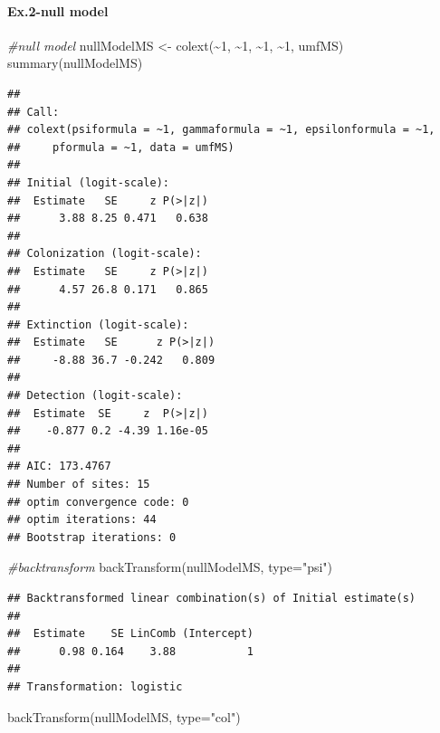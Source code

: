 \documentclass[
]{article}
\newenvironment{Shaded}{\begin{snugshade}}{\end{snugshade}}
\newcommand{\AttributeTok}[1]{\textcolor[rgb]{0.77,0.63,0.00}{#1}}
\newcommand{\CommentTok}[1]{\textcolor[rgb]{0.56,0.35,0.01}{\textit{#1}}}
\newcommand{\DecValTok}[1]{\textcolor[rgb]{0.00,0.00,0.81}{#1}}
\newcommand{\FunctionTok}[1]{\textcolor[rgb]{0.00,0.00,0.00}{#1}}
\newcommand{\NormalTok}[1]{#1}
\newcommand{\OtherTok}[1]{\textcolor[rgb]{0.56,0.35,0.01}{#1}}
\newcommand{\SpecialCharTok}[1]{\textcolor[rgb]{0.00,0.00,0.00}{#1}}
\newcommand{\StringTok}[1]{\textcolor[rgb]{0.31,0.60,0.02}{#1}}
\begin{document}
\hypertarget{ex.2-null-model}{%
\paragraph{\texorpdfstring{\textbf{Ex.2-null model
}}{Ex.2-null model }}\label{ex.2-null-model}}

\begin{Shaded}
\begin{Highlighting}[]
\CommentTok{\#null model}
\NormalTok{nullModelMS }\OtherTok{\textless{}{-}} \FunctionTok{colext}\NormalTok{(}\SpecialCharTok{\textasciitilde{}}\DecValTok{1}\NormalTok{, }\SpecialCharTok{\textasciitilde{}}\DecValTok{1}\NormalTok{, }\SpecialCharTok{\textasciitilde{}}\DecValTok{1}\NormalTok{, }\SpecialCharTok{\textasciitilde{}}\DecValTok{1}\NormalTok{, umfMS)}
\FunctionTok{summary}\NormalTok{(nullModelMS)}
\end{Highlighting}
\end{Shaded}

\begin{verbatim}
## 
## Call:
## colext(psiformula = ~1, gammaformula = ~1, epsilonformula = ~1, 
##     pformula = ~1, data = umfMS)
## 
## Initial (logit-scale):
##  Estimate   SE     z P(>|z|)
##      3.88 8.25 0.471   0.638
## 
## Colonization (logit-scale):
##  Estimate   SE     z P(>|z|)
##      4.57 26.8 0.171   0.865
## 
## Extinction (logit-scale):
##  Estimate   SE      z P(>|z|)
##     -8.88 36.7 -0.242   0.809
## 
## Detection (logit-scale):
##  Estimate  SE     z  P(>|z|)
##    -0.877 0.2 -4.39 1.16e-05
## 
## AIC: 173.4767 
## Number of sites: 15
## optim convergence code: 0
## optim iterations: 44 
## Bootstrap iterations: 0
\end{verbatim}

\begin{Shaded}
\begin{Highlighting}[]
\CommentTok{\#backtransform}
\FunctionTok{backTransform}\NormalTok{(nullModelMS, }\AttributeTok{type=}\StringTok{"psi"}\NormalTok{)}
\end{Highlighting}
\end{Shaded}

\begin{verbatim}
## Backtransformed linear combination(s) of Initial estimate(s)
## 
##  Estimate    SE LinComb (Intercept)
##      0.98 0.164    3.88           1
## 
## Transformation: logistic
\end{verbatim}

\begin{Shaded}
\begin{Highlighting}[]
\FunctionTok{backTransform}\NormalTok{(nullModelMS, }\AttributeTok{type=}\StringTok{"col"}\NormalTok{)}
\end{Highlighting}
\end{Shaded}
\end{document}
